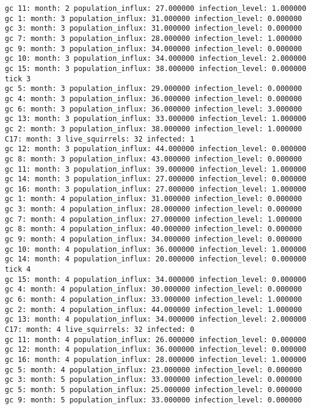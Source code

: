 \begin{lstlisting}[basicstyle=\tiny]
gc 11: month: 2 population_influx: 27.000000 infection_level: 1.000000
gc 1: month: 3 population_influx: 31.000000 infection_level: 0.000000
gc 3: month: 3 population_influx: 31.000000 infection_level: 0.000000
gc 7: month: 3 population_influx: 28.000000 infection_level: 1.000000
gc 9: month: 3 population_influx: 34.000000 infection_level: 0.000000
gc 10: month: 3 population_influx: 34.000000 infection_level: 2.000000
gc 15: month: 3 population_influx: 38.000000 infection_level: 0.000000
tick 3
gc 5: month: 3 population_influx: 29.000000 infection_level: 0.000000
gc 4: month: 3 population_influx: 36.000000 infection_level: 0.000000
gc 6: month: 3 population_influx: 36.000000 infection_level: 3.000000
gc 13: month: 3 population_influx: 33.000000 infection_level: 1.000000
gc 2: month: 3 population_influx: 38.000000 infection_level: 1.000000
C17: month: 3 live_squirrels: 32 infected: 1
gc 12: month: 3 population_influx: 44.000000 infection_level: 0.000000
gc 8: month: 3 population_influx: 43.000000 infection_level: 0.000000
gc 11: month: 3 population_influx: 39.000000 infection_level: 1.000000
gc 14: month: 3 population_influx: 27.000000 infection_level: 0.000000
gc 16: month: 3 population_influx: 27.000000 infection_level: 1.000000
gc 1: month: 4 population_influx: 31.000000 infection_level: 0.000000
gc 3: month: 4 population_influx: 28.000000 infection_level: 0.000000
gc 7: month: 4 population_influx: 27.000000 infection_level: 1.000000
gc 8: month: 4 population_influx: 40.000000 infection_level: 0.000000
gc 9: month: 4 population_influx: 34.000000 infection_level: 0.000000
gc 10: month: 4 population_influx: 36.000000 infection_level: 1.000000
gc 14: month: 4 population_influx: 20.000000 infection_level: 0.000000
tick 4
gc 15: month: 4 population_influx: 34.000000 infection_level: 0.000000
gc 4: month: 4 population_influx: 30.000000 infection_level: 0.000000
gc 6: month: 4 population_influx: 33.000000 infection_level: 1.000000
gc 2: month: 4 population_influx: 44.000000 infection_level: 1.000000
gc 13: month: 4 population_influx: 34.000000 infection_level: 2.000000
C17: month: 4 live_squirrels: 32 infected: 0
gc 11: month: 4 population_influx: 26.000000 infection_level: 0.000000
gc 12: month: 4 population_influx: 36.000000 infection_level: 0.000000
gc 16: month: 4 population_influx: 28.000000 infection_level: 1.000000
gc 5: month: 4 population_influx: 23.000000 infection_level: 0.000000
gc 3: month: 5 population_influx: 33.000000 infection_level: 0.000000
gc 5: month: 5 population_influx: 25.000000 infection_level: 0.000000
gc 9: month: 5 population_influx: 33.000000 infection_level: 0.000000

\end{lstlisting}
